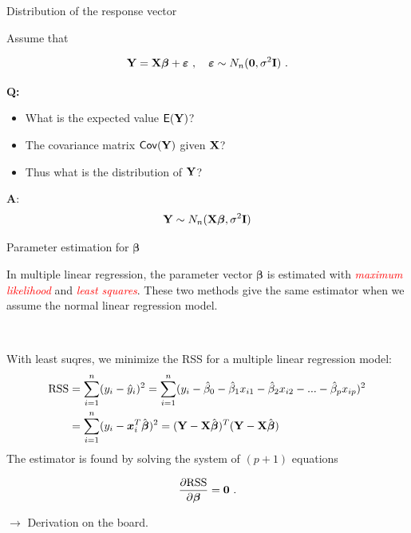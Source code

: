 \documentclass[
  10pt,
  ignorenonframetext,
]{beamer}
\begin{document}
\begin{frame}
\begin{block}{Distribution of the response vector}
\protect\hypertarget{distribution-of-the-response-vector}{}
\(~\)

Assume that

\[{\bf Y=X \boldsymbol\beta}+{\boldsymbol \varepsilon} \ , \quad \boldsymbol\varepsilon\sim N_n({\bf 0},\sigma^2 {\bf I}) \ . \]

\vspace{4mm}

\textbf{Q:}

\begin{itemize}
\item
  What is the expected value \(\mathsf{E}(\bf Y)\)?
\item
  The covariance matrix \(\mathsf{Cov}(\bf Y)\) given \(\bf{X}\)?
\item
  Thus what is the distribution of \(\bf Y\)?
\end{itemize}
\end{block}
\end{frame}

\begin{frame}
\textbf{A}:
\[ {\bf Y} \sim N_{n}({\bf X} {\boldsymbol\beta},\sigma^2 {\bf I})\]
\end{frame}

\begin{frame}
\begin{block}{Parameter estimation for \(\boldsymbol{\beta}\)}
\protect\hypertarget{parameter-estimation-for-boldsymbolbeta}{}
\(~\)

In multiple linear regression, the parameter vector \(\boldsymbol\beta\)
is estimated with \emph{\textcolor{red}{maximum likelihood}} and
\emph{\textcolor{red}{least squares}}. These two methods give the same
estimator when we assume the normal linear regression model.

\(~\)

With least suqres, we minimize the RSS for a multiple linear regression
model:
\[\begin{aligned} \text{RSS} &=\sum_{i=1}^n (y_i - \hat y_i)^2 = \sum_{i=1}^n (y_i - \hat \beta_0 - \hat \beta_1 x_{i1} - \hat \beta_2 x_{i2} -...-\hat \beta_p x_{ip} )^2 \\
&= \sum_{i=1}^n (y_i-{\boldsymbol x}_i^T \hat{\boldsymbol\beta})^2=({\bf Y}-{\bf X}\hat{\boldsymbol{\beta}})^T({\bf Y}-{\bf X}\hat{\boldsymbol{\beta}})\end{aligned}\]
The estimator is found by solving the system of \((p+1)\) equations

\[\frac{\partial \text{RSS}}{\partial \boldsymbol \beta}={\bf 0} \ .\]

\(\rightarrow\) Derivation on the board.
\end{block}
\end{frame}
\end{document}
